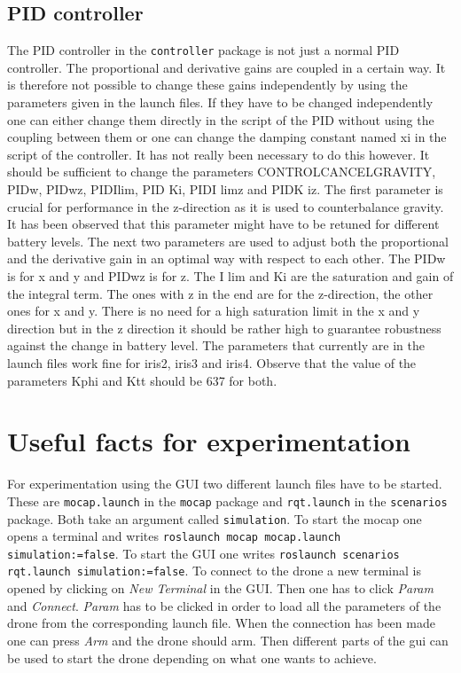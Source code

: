 \documentclass[titlepage,11pt,a4paper]{article}
\begin{document}
\subsection{PID controller}
\label{subsec:pid}
The PID controller in the \texttt{controller} package is not just a
normal PID controller. The proportional and derivative gains are
coupled in a certain way. It is therefore not possible to change these
gains independently by using the parameters given in the launch
files. If they have to be changed independently one can either change
them directly in the script of the PID without using the coupling
between them or one can change the damping constant named
x\textunderscore i in the script of the controller. It has not really
been necessary to do this however.  It should be sufficient to change
the parameters CONTROL\textunderscore CANCEL\textunderscore GRAVITY,
PID\textunderscore w, PID\textunderscore w\textunderscore z,
PID\textunderscore I\textunderscore lim, PID \textunderscore
K\textunderscore i, PID\textunderscore I\textunderscore
lim\textunderscore z and PID\textunderscore K\textunderscore
i\textunderscore z. The first parameter is crucial for performance in
the z-direction as it is used to counterbalance gravity. It has been
observed that this parameter might have to be retuned for different
battery levels. The next two parameters are used to adjust both the
proportional and the derivative gain in an optimal way with respect to
each other. The PID\textunderscore w is for x and y and
PID\textunderscore w\textunderscore z is for z. The I\textunderscore
lim and K\textunderscore i are the saturation and gain of the integral
term. The ones with \textunderscore z in the end are for the
z-direction, the other ones for x and y. There is no need for a high
saturation limit in the x and y direction but in the z direction it
should be rather high to guarantee robustness against the change in
battery level. The parameters that currently are in the launch files
work fine for iris2, iris3 and iris4.  Observe that the value of the
parameters Kphi and Ktt should be 637 for both.

\section{Useful facts for experimentation}
For experimentation using the GUI two different launch files have to
be started. These are \texttt{mocap.launch} in the \texttt{mocap}
package and \texttt{rqt.launch} in the \texttt{scenarios}
package. Both take an argument called \texttt{simulation}. To start
the mocap one opens a terminal and writes \texttt{roslaunch mocap
  mocap.launch simulation:=false}. To start the GUI one writes
\texttt{roslaunch scenarios rqt.launch simulation:=false}. To connect
to the drone a new terminal is opened by clicking on \textit{New
  Terminal} in the GUI. Then one has to click \textit{Param} and
\textit{Connect}. \textit{Param} has to be clicked in order to load
all the parameters of the drone from the corresponding launch
file. When the connection has been made one can press \textit{Arm} and
the drone should arm. Then different parts of the gui can be used to
start the drone depending on what one wants to achieve.
\end{document}
